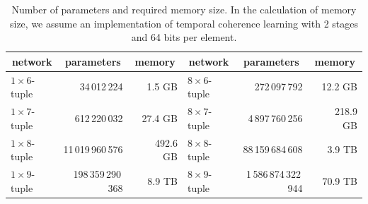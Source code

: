 \begin{table}
\setlength{\doublerulesep}{.4pt}
 \caption{Number of parameters and required memory size.  In the calculation of memory size, we assume an implementation of temporal coherence learning with 2 stages and 64 bits per element.}
\label{table:NTupleMemory}
 \centering\begin{tabular}{l|rr||l|rr}
\hline\hline
  \multicolumn{1}{c|}{network} & \multicolumn{1}{c}{parameters} & \multicolumn{1}{c||}{memory} & \multicolumn{1}{c|}{network} & \multicolumn{1}{c}{parameters} & \multicolumn{1}{c}{memory} \\
\hline
  $1 \times 6$-tuple & 34\,012\,224 & 1.5 GB &  $8 \times 6$-tuple & 272\,097\,792 & 12.2 GB \\
  $1 \times 7$-tuple & 612\,220\,032 & 27.4 GB &  $8 \times 7$-tuple & 4\,897\,760\,256 & ~~218.9 GB \\
  $1 \times 8$-tuple & 11\,019\,960\,576 & ~~492.6 GB &  $8 \times 8$-tuple & 88\,159\,684\,608 & 3.9 TB \\
  $1 \times 9$-tuple & 198\,359\,290\,368 & 8.9 TB &  $8 \times 9$-tuple & 1\,586\,874\,322\,944 & 70.9 TB \\
\hline
 \end{tabular}
\end{table}


